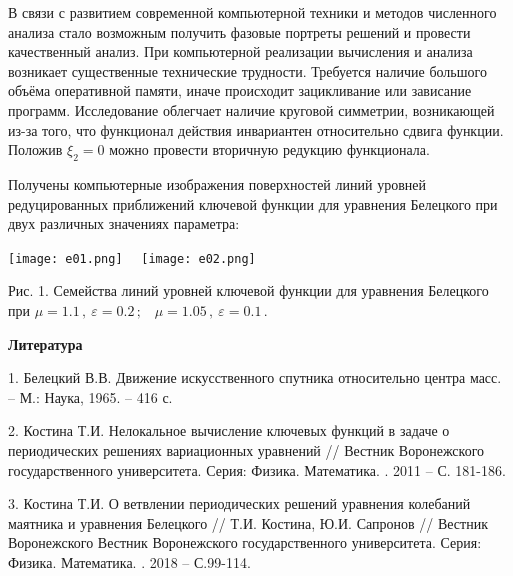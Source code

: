  В связи с развитием современной компьютерной техники и методов численного анализа стало возможным получить фазовые портреты решений и провести качественный анализ.
 При компьютерной реализации
вычисления и анализа  возникает существенные технические
трудности. Требуется наличие большого объёма оперативной памяти, иначе происходит зацикливание или зависание программ.
 Исследование облегчает наличие  круговой симметрии, возникающей из-за
того, что функционал действия инвариантен относительно
сдвига функции. Положив $\xi_2=0$ можно провести вторичную редукцию функционала.


Получены  компьютерные изображения поверхностей линий уровней
редуцированных приближений ключевой функции для уравнения Белецкого при двух различных значениях параметра:

\begin{center}
\texttt{[image: e01.png]} \ \
\texttt{[image: e02.png]}

Рис. 1. Семейства линий уровней  ключевой функции  для уравнения Белецкого при {$\mu
= 1.1\,, \ \varepsilon=0.2\,;$ \ $\mu = 1.05\,, \
\varepsilon=0.1\,. $}

\end{center}






\smallskip \centerline {\bf Литература} \nopagebreak

1. Белецкий В.В. Движение искусственного спутника относительно центра масс.
-- М.: Наука, 1965. -- 416 с.


2. Костина Т.И. Нелокальное вычисление ключевых функций в задаче о
периодических решениях вариационных уравнений // Вестник
Воронежского государственного университета. Серия: Физика.
Математика. . 2011 -- С. 181-186.


3. Костина Т.И. О ветвлении периодических решений уравнения  колебаний маятника и уравнения Белецкого // Т.И. Костина, Ю.И. Сапронов // Вестник Воронежского Вестник
Воронежского государственного университета. Серия: Физика.
Математика. \No 1. 2018 -- С.99-114.



% 
